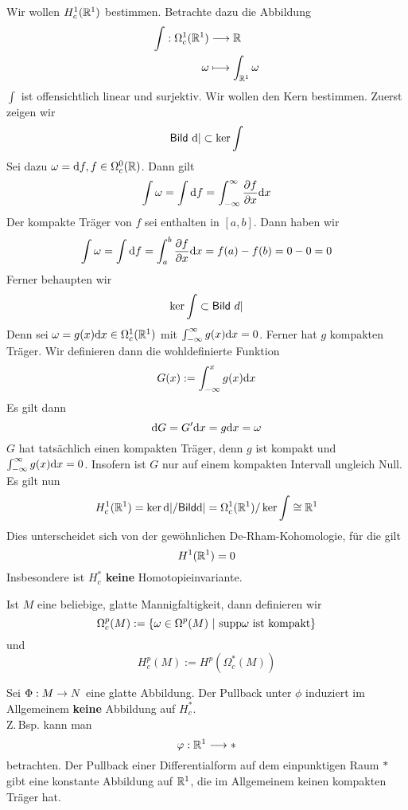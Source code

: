 \Bsp{}
Wir wollen $H^1_c(\mathbb{R}^1)$ bestimmen. Betrachte dazu die Abbildung
\begin{align*}
\int : \Omega_c^1(\mathbb{R}^1) & \overset{}{\longrightarrow} \mathbb{R}\\
\omega &\longmapsto \int_{\mathbb{R}^1}\omega
\end{align*}
$\int$ ist offensichtlich linear und surjektiv. Wir wollen den Kern bestimmen. Zuerst zeigen wir
\[ \textsf{Bild}\ \text{d}| \subset \ker \int \]
Sei dazu $\omega = \text{d} f, f\in \Omega_c^0(\mathbb{R})$. Dann gilt
\[\int \omega = \int \text{d} f = \int_{-\infty}^{\infty} \frac{\partial f}{\partial x} \text{d} x \]
Der kompakte Träger von $f$ sei enthalten in $[a,b]$. Dann haben wir
\[\int \omega = \int \text{d} f = \int_{a}^{b} \frac{\partial f}{\partial x} \text{d} x = f(a) - f(b) = 0-0 = 0 \]
Ferner behaupten wir
\[ \ker \int \subset \textsf{Bild}\ d| \]
Denn sei $\omega = g(x)\text{d} x \in \Omega_c^1(\mathbb{R}^1)$ mit $\int_{-\infty}^{\infty}g(x)\text{d} x = 0$. Ferner hat $g$ kompakten Träger. Wir definieren dann die wohldefinierte Funktion
\[ G(x) := \int_{-\infty}^xg(x) \text{d} x \]
Es gilt dann
\[ \text{d} G = G' \text{d} x = g \text{d} x = \omega \]
$G$ hat tatsächlich einen kompakten Träger, denn $g$ ist kompakt und $\int_{-\infty}^{\infty}g(x)\text{d} x = 0$. Insofern ist $G$ nur auf einem kompakten Intervall ungleich Null.\\
Es gilt nun
\[ H^1_c(\mathbb{R}^1) = \ker \text{d}| / \textsf{Bild} \text{d}| = \Omega_c^1(\mathbb{R}^1) / \ker \int \overset{}{\cong} \mathbb{R}^1 \]
Dies unterscheidet sich von der gewöhnlichen De-Rham-Kohomologie, für die gilt
\[H^1(\mathbb{R}^1) = 0\]
Insbesondere ist $H^*_c$ \textbf{keine} Homotopieinvariante.

\Def{}
Ist $M$ eine beliebige, glatte Mannigfaltigkeit, dann definieren wir
\[ \Omega_c^p(M) := \set{\omega \in \Omega^p(M)}{\supp \omega \text{ ist kompakt}} \]
und
\[H^p_c(M) := H^p(\Omega_c^*(M))\]

\Bem{}
Sei $\Phi : M \overset{}{\rightarrow} N$ eine glatte Abbildung. Der Pullback unter $\phi$ induziert im Allgemeinem \textbf{keine} Abbildung auf $H^*_c$.\\
Z.\,Bsp. kann man
\[ \varphi : \mathbb{R}^1 \overset{}{\longrightarrow} \ast  \]
betrachten. Der Pullback einer Differentialform auf dem einpunktigen Raum $\ast$ gibt eine konstante Abbildung auf $\mathbb{R}^1$, die im Allgemeinem keinen kompakten Träger hat.

